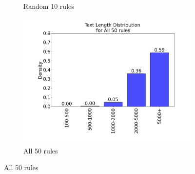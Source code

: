 \documentclass{article}
\begin{document}
\begin{figure}[H]
\begin{subfigure}{0.32\textwidth}
    \caption{Random 10 rules}
\end{subfigure}
\begin{subfigure}{0.32\textwidth}
    \includegraphics[width=\linewidth]{figures/IMDB_data_length_distribution_plots/data_length_distribution_ft_all50rules.png}
    \caption{All 50 rules}
\end{subfigure}


\end{figure}
\end{document}

